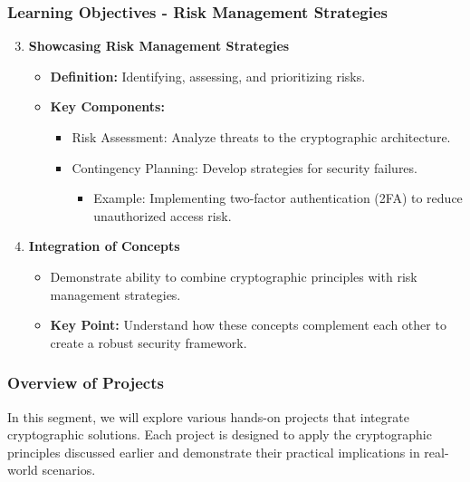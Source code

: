 \documentclass{beamer}
\begin{document}
\begin{frame}[fragile]
    \frametitle{Learning Objectives - Risk Management Strategies}
    \begin{enumerate}
        \setcounter{enumi}{2}
        \item \textbf{Showcasing Risk Management Strategies}
        \begin{itemize}
            \item \textbf{Definition:} Identifying, assessing, and prioritizing risks.
            \item \textbf{Key Components:}
            \begin{itemize}
                \item Risk Assessment: Analyze threats to the cryptographic architecture.
                \item Contingency Planning: Develop strategies for security failures.
                \begin{itemize}
                    \item Example: Implementing two-factor authentication (2FA) to reduce unauthorized access risk.
                \end{itemize}
            \end{itemize}
        \end{itemize}
        
        \item \textbf{Integration of Concepts}
        \begin{itemize}
            \item Demonstrate ability to combine cryptographic principles with risk management strategies.
            \item \textbf{Key Point:} Understand how these concepts complement each other to create a robust security framework.
        \end{itemize}
    \end{enumerate}
\end{frame}

\begin{frame}[fragile]
    \frametitle{Overview of Projects}
    In this segment, we will explore various hands-on projects that integrate cryptographic solutions. Each project is designed to apply the cryptographic principles discussed earlier and demonstrate their practical implications in real-world scenarios.
\end{frame}
\end{document}
